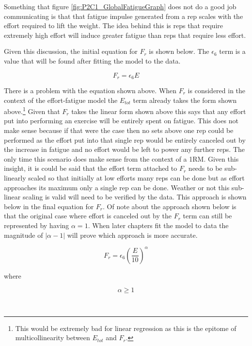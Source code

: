 Something that figure \ref{fig:P2C1_GlobalFatigueGraph} does not do a good job communicating is that that fatigue impulse generated from a rep scales with the effort required to lift the weight. The idea behind this is reps that require extremely high effort will induce greater fatigue than reps that require less effort.

Given this discussion, the initial equation for $F_r$ is shown below. The $\epsilon_6$ term is a value that will be found after fitting the model to the data.

\begin{equation*}
	F_r=\epsilon_6 E
\end{equation*}

There is a problem with the equation shown above. When $F_r$ is considered in the context of the effort-fatigue model the $E_{tot}$ term already takes the form shown above.\footnote{This would be extremely bad for linear regression as this is the epitome of multicollinearity between $E_{tot}$ and $F_r$.} Given that $F_r$ takes the linear form shown above this says that any effort put into performing an exercise will be entirely spent on fatigue. This does not make sense because if that were the case then no sets above one rep could be performed as the effort put into that single rep would be entirely canceled out by the increase in fatigue and no effort would be left to power any further reps. The only time this scenario does make sense from the context of a 1RM. Given this insight, it is could be said that the effort term attached to $F_r$ needs to be sub-linearly scaled so that initially at low efforts many reps can be done but as effort approaches its maximum only a single rep can be done. Weather or not this sub-linear scaling is valid will need to be verified by the data. This approach is shown below in the final equation for $F_r$. Of note about the approach shown below is that the original case where effort is canceled out by the $F_r$ term can still be represented by having $\alpha=1$. When later chapters fit the model to data the magnitude of $|\alpha -1|$ will prove which approach is more accurate.

\begin{minipage}{\textwidth}
	\begin{equation}
		\label{eq:P2C1_InterRepFatigue}
		F_r=\epsilon_6 \left( \frac{E}{10} \right)^\alpha
	\end{equation}
	\centerline{where}
	\begin{equation*}
	    \alpha \ge 1
	\end{equation*}
\end{minipage}\\



